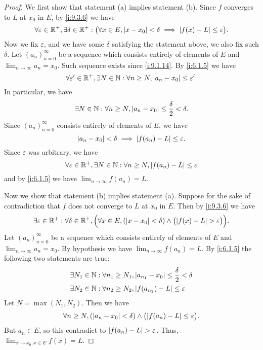 \begin{proof}
  We first show that statement (a) implies statement (b).
  Since \(f\) converges to \(L\) at \(x_0\) in \(E\), by \cref{i:9.3.6} we have
  \[
    \forall \varepsilon \in \mathbb{R}^+, \exists \delta \in \mathbb{R}^+ : \big(\forall x \in E, \left\lvert x - x_0\right\rvert < \delta \implies \left\lvert f(x) - L\right\rvert \leq \varepsilon\big).
  \]
  Now we fix \(\varepsilon\), and we have some \(\delta\) satisfying the statement above, we also fix such \(\delta\).
  Let \((a_n)_{n = 0}^\infty\) be a sequence which consists entirely of elements of \(E\) and \(\lim_{n \to \infty} a_n = x_0\).
  Such sequence exists since \cref{i:9.1.14}.
  By \cref{i:6.1.5} we have
  \[
    \forall \varepsilon' \in \mathbb{R}^+, \exists N \in \mathbb{N} : \forall n \geq N, \left\lvert a_n - x_0\right\rvert \leq \varepsilon'.
  \]
  In particular, we have
  \[
    \exists N \in \mathbb{N} : \forall n \geq N, \left\lvert a_n - x_0\right\rvert \leq \dfrac{\delta}{2} < \delta.
  \]
  Since \((a_n)_{n = 0}^\infty\) consists entirely of elements of \(E\), we have
  \[
    \left\lvert a_n - x_0\right\rvert < \delta \implies \left\lvert f(a_n) - L\right\rvert \leq \varepsilon.
  \]
  Since \(\varepsilon\) was arbitrary, we have
  \[
    \forall \varepsilon \in \mathbb{R}^+, \exists N \in \mathbb{N} : \forall n \geq N, \left\lvert f(a_n) - L\right\rvert \leq \varepsilon
  \]
  and by \cref{i:6.1.5} we have \(\lim_{n \to \infty} f(a_n) = L\).

  Now we show that statement (b) implies statement (a).
  Suppose for the sake of contradiction that \(f\) does not converge to \(L\) at \(x_0\) in \(E\).
  Then by \cref{i:9.3.6} we have
  \[
    \exists \varepsilon \in \R^+ : \forall \delta \in \R^+, \Big(\forall x \in E, (\abs{x - x_0} < \delta) \land \big(\abs{f(x) - L} > \varepsilon\big)\Big).
  \]
  Let \((a_n)_{n = 0}^\infty\) be a sequence which consists entirely of elements of \(E\) and \(\lim_{n \to \infty} a_n = x_0\).
  By hypothesis we have \(\lim_{n \to \infty} f(a_n) = L\).
  By \cref{i:6.1.5} the following two statements are true:
  \begin{align*}
     & \exists N_1 \in \mathbb{N} : \forall n_1 \geq N_1, \left\lvert a_{n_1} - x_0\right\rvert \leq \dfrac{\delta}{2} < \delta \\
     & \exists N_2 \in \mathbb{N} : \forall n_2 \geq N_2, \left\lvert f(a_{n_2}) - L\right\rvert \leq \varepsilon
  \end{align*}
  Let \(N = \max(N_1, N_2)\).
  Then we have
  \[
    \forall n \geq N, (\abs{a_n - x_0} < \delta) \land \big(\abs{f(a_n) - L} \leq \varepsilon\big).
  \]
  But \(a_n \in E\), so this contradict to \(\left\lvert f(a_n) - L\right\rvert > \varepsilon\).
  Thus, \(\lim_{x \to x_0 ; x \in E} f(x) = L\).
\end{proof}

